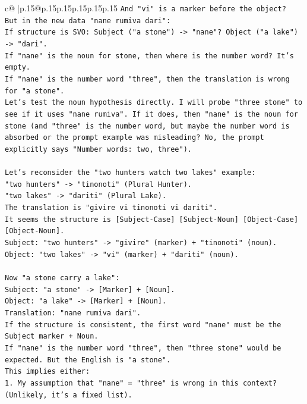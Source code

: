 \documentclass{article}
\begin{document}
{\begin{supertabular}{c@{$\;$}|p{.15\linewidth}@{}p{.15\linewidth}p{.15\linewidth}p{.15\linewidth}p{.15\linewidth}p{.15\linewidth}}
{{{\texttt{And "vi" is a marker before the object?} \\
\texttt{But in the new data "nane rumiva dari":} \\
\texttt{If structure is SVO: Subject ("a stone") {-}> "nane"? Object ("a lake") {-}> "dari".} \\
\texttt{If "nane" is the noun for stone, then where is the number word? It's empty.} \\
\texttt{If "nane" is the number word "three", then the translation is wrong for "a stone".} \\
\texttt{Let's test the noun hypothesis directly. I will probe "three stone" to see if it uses "nane rumiva". If it does, then "nane" is the noun for stone (and "three" is the number word, but maybe the number word is absorbed or the prompt example was misleading? No, the prompt explicitly says "Number words: two, three").} \\
\\ 
\texttt{Let's reconsider the "two hunters watch two lakes" example:} \\
\texttt{"two hunters" {-}> "tinonoti" (Plural Hunter).} \\
\texttt{"two lakes" {-}> "dariti" (Plural Lake).} \\
\texttt{The translation is "givire vi tinonoti vi dariti".} \\
\texttt{It seems the structure is {[}Subject{-}Case{]} {[}Subject{-}Noun{]} {[}Object{-}Case{]} {[}Object{-}Noun{]}.} \\
\texttt{Subject: "two hunters" {-}> "givire" (marker) + "tinonoti" (noun).} \\
\texttt{Object: "two lakes" {-}> "vi" (marker) + "dariti" (noun).} \\
\\ 
\texttt{Now "a stone carry a lake":} \\
\texttt{Subject: "a stone" {-}> {[}Marker{]} + {[}Noun{]}.} \\
\texttt{Object: "a lake" {-}> {[}Marker{]} + {[}Noun{]}.} \\
\texttt{Translation: "nane rumiva dari".} \\
\texttt{If the structure is consistent, the first word "nane" must be the Subject marker + Noun.} \\
\texttt{If "nane" is the number word "three", then "three stone" would be expected. But the English is "a stone".} \\
\texttt{This implies either:} \\
\texttt{1. My assumption that "nane" = "three" is wrong in this context? (Unlikely, it's a fixed list).} \\
}}}
\end{supertabular}}
\end{document}
